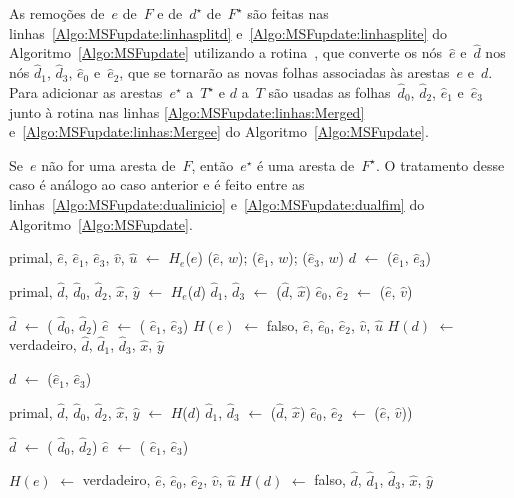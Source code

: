 As remoções de~$e$ de~$F$ e de~$d^\star$ de~$F^\star$ são feitas nas linhas~\ref{Algo:MSFupdate:linhasplitd} e~\ref{Algo:MSFupdate:linhasplite} do Algoritmo~\ref{Algo:MSFupdate} utilizando a rotina~\LCOSplit{}, que converte os nós~$\hat e$ e~$\hat d$ nos nós $\hat d_1$, $\hat d_3$, $\hat e_0$ e~$\hat e_2$, que se tornarão as novas folhas associadas às arestas~$e$ e~$d$.
Para adicionar as arestas~$e^\star$ a~$T^\star$ e $d$ a~$T$ são usadas as folhas~$\hat d_0$, $\hat d_2$, $\hat e_1$ e~$\hat e_3$ junto à rotina \LCOMerge{} nas linhas \ref{Algo:MSFupdate:linhas:Merged} e~\ref{Algo:MSFupdate:linhas:Mergee} do Algoritmo~\ref{Algo:MSFupdate}.

Se~$e$ não for uma aresta de~$F$, então~$e^\star$ é uma aresta de~$F^\star$.
O tratamento desse caso é análogo ao caso anterior e é feito entre as linhas~\ref{Algo:MSFupdate:dualinicio} e~\ref{Algo:MSFupdate:dualfim} do Algoritmo~\ref{Algo:MSFupdate}.

\begin{algorithm}[htb]
\caption{\MSFupdate($G$, $e$, $w$)}
\label{Algo:MSFupdate}
\begin{algorithmic}[1]
\State primal, $\hat e$, $\hat e_1$, $\hat e_3$, $\hat v$, $\hat u$ $\gets$ $H_e$($e$)
\State \LCOAddCost($\hat e$, $w$); \LCOAddCost($\hat e_1$, $w$); \LCOAddCost($\hat e_3$, $w$)
\State $d$ $\gets$ \LCOMin($\hat e_1$, $\hat e_3$)\label{Algo:MSFupdate:linhamin}

\State primal, $\hat d$, $\hat d_0$, $\hat d_2$, $\hat x$, $\hat y$ $\gets$ $H_e$($d$)
\State $\hat d_1$, $\hat d_3$ $\gets$ \LCOSplit($\hat d$, $\hat x$)\label{Algo:MSFupdate:linhasplitd}
\State $\hat e_0$, $\hat e_2$ $\gets$ \LCOSplit($\hat e$, $\hat v$)\label{Algo:MSFupdate:linhasplite}


\State $\hat d$ $\gets$ \LCOMerge( $\hat d_0$, $\hat d_2$)\label{Algo:MSFupdate:linhas:Merged}
\State $\hat e$ $\gets$ \LCOMerge( $\hat e_1$, $\hat e_3$)\label{Algo:MSFupdate:linhas:Mergee}
\State $H(e)$ $\gets$ falso, $\hat e$, $\hat e_0$, $\hat e_2$, $\hat v$, $\hat u$
\State $H(d)$ $\gets$ verdadeiro, $\hat d$, $\hat d_1$, $\hat d_3$, $\hat x$, $\hat y$

\EndIf

\Else
\State $d$ $\gets$ \LCOMax($\hat e_1$, $\hat e_3$)\label{Algo:MSFupdate:dualinicio}

\State primal, $\hat d$, $\hat d_0$, $\hat d_2$, $\hat x$, $\hat y$ $\gets$ $H$($d$)
\State $\hat d_1$, $\hat d_3$ $\gets$ \LCOSplit($\hat d$, $\hat x$)
\State $\hat e_0$, $\hat e_2$ $\gets$ \LCOSplit($\hat e$, $\hat v$))

\State $\hat d$ $\gets$ \LCOMerge( $\hat d_0$, $\hat d_2$)
\State $\hat e$ $\gets$ \LCOMerge( $\hat e_1$, $\hat e_3$)

\State $H(e)$ $\gets$ verdadeiro, $\hat e$, $\hat e_0$, $\hat e_2$, $\hat v$, $\hat u$
\State $H(d)$ $\gets$ falso, $\hat d$, $\hat d_1$, $\hat d_3$, $\hat x$, $\hat y$

\EndIf
\EndIf\label{Algo:MSFupdate:dualfim}
\end{algorithmic}
\end{algorithm}



